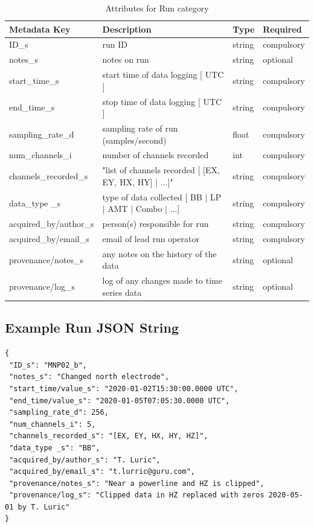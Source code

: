 \documentclass{article}
\begin{document}
\begin{table}[htb!]
	\caption[Attributes for Run]{Attributes for Run category}
	\begin{tabular}{|l|p{3in}|l|l|}
		\hline
		\textbf{Metadata Key} & \textbf{Description} & \textbf{Type} & \textbf{Required} \\ \hline
		ID\_s & run ID & string & compulsory \\ \hline
		notes\_s & notes on run & string & optional \\ \hline
		start\_time\_s & start time of data logging [ UTC ] & string & compulsory \\ \hline
		end\_time\_s & stop time of data logging [ UTC ] & string & compulsory \\ \hline
		sampling\_rate\_d & sampling rate of run (samples/second) & float & compulsory \\ \hline
		num\_channels\_i & number of channels recorded & int & compulsory \\ \hline
		channels\_recorded\_s & "list of channels recorded [ [EX, EY, HX, HY] $|$ ...]" & string & compulsory \\ \hline
		data\_type \_s & type of data collected [ BB $|$ LP $|$ AMT $|$ Combo $|$ ...] & string & compulsory \\ \hline
		acquired\_by/author\_s & person(s) responsible for run & string & compulsory \\ \hline
		acquired\_by/email\_s & email of lead run operator & string & compulsory \\ \hline
		provenance/notes\_s & any notes on the history of the data & string & optional \\ \hline
		provenance/log\_s & log of any changes made to time series data & string & optional \\ \hline
	\end{tabular}
	\label{tab:run}
\end{table}

\subsection{Example Run JSON String}

\begin{verbatim}
{
 "ID_s": "MNP02_b",
 "notes_s": "Changed north electrode",
 "start_time/value_s": "2020-01-02T15:30:00.0000 UTC",
 "end_time/value_s": "2020-01-05T07:05:30.0000 UTC",
 "sampling_rate_d": 256,
 "num_channels_i": 5,
 "channels_recorded_s": "[EX, EY, HX, HY, HZ]",
 "data_type _s": "BB",
 "acquired_by/author_s": "T. Luric",
 "acquired_by/email_s": "t.lurric@guru.com",
 "provenance/notes_s": "Near a powerline and HZ is clipped",
 "provenance/log_s": "Clipped data in HZ replaced with zeros 2020-05-01 by T. Luric"
}
\end{verbatim}
\end{document}
